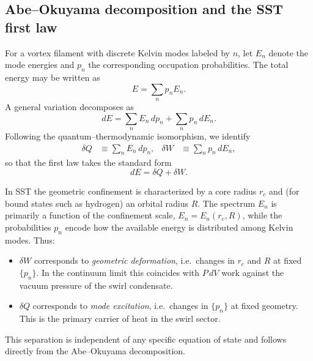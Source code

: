 \documentclass[11pt]{article}
\newcommand{\rc}{r_c}                                    %
\begin{document}
        \subsection{Abe--Okuyama decomposition and the SST first law}
            \label{subsec:abe-okuyama-decomposition}

            For a vortex filament with discrete Kelvin modes labeled by $n$, let
            $E_n$ denote the mode energies and $p_n$ the corresponding occupation
            probabilities. The total energy may be written as
            \begin{equation}
                E = \sum_n p_n E_n.
            \end{equation}
            A general variation decomposes as
            \begin{equation}
                dE
                = \sum_n E_n\,dp_n + \sum_n p_n\,dE_n.
                \label{eq:sst-dE-decomposition}
            \end{equation}
            Following the quantum--thermodynamic isomorphism, we identify
            \begin{align}
                \delta Q &\equiv \sum_n E_n\,dp_n,
                &
                \delta W &\equiv \sum_n p_n\,dE_n,
                \label{eq:sst-dQ-dW}
            \end{align}
            so that the first law takes the standard form
            \begin{equation}
                dE = \delta Q + \delta W.
            \end{equation}

            In SST the geometric confinement is characterized by a core radius
            $\rc$ and (for bound states such as hydrogen) an orbital radius $R$.
            The spectrum $E_n$ is primarily a function of the confinement scale,
            $E_n = E_n(\rc,R)$, while the probabilities $p_n$ encode how the
            available energy is distributed among Kelvin modes.
            Thus:
            \begin{itemize}
                \item $\delta W$ corresponds to \emph{geometric deformation},
                i.e.\ changes in $\rc$ and $R$ at fixed $\{p_n\}$.
                In the continuum limit this coincides with $P\,dV$ work against the
                vacuum pressure of the swirl condensate.

                \item $\delta Q$ corresponds to \emph{mode excitation}, i.e.\
                changes in $\{p_n\}$ at fixed geometry. This is the primary carrier
                of heat in the swirl sector.
            \end{itemize}
            This separation is independent of any specific equation of state and
            follows directly from the Abe--Okuyama decomposition.
\end{document}
